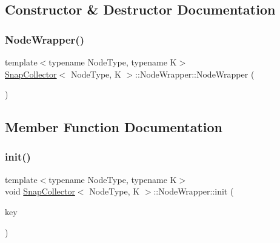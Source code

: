 \subsection{Constructor \& Destructor Documentation}
\mbox{\label{classSnapCollector_1_1NodeWrapper_a2c01b80b410f3d2d3ab88de500756085}} 
\subsubsection{\texorpdfstring{Node\+Wrapper()}{NodeWrapper()}}
{\footnotesize\ttfamily template$<$typename Node\+Type, typename K$>$ \\
\hyperlink{classSnapCollector}{Snap\+Collector}$<$ Node\+Type, K $>$\+::Node\+Wrapper\+::\+Node\+Wrapper (\begin{DoxyParamCaption}{ }\end{DoxyParamCaption})\hspace{0.3cm}{\ttfamily [inline]}}



\subsection{Member Function Documentation}
\mbox{\label{classSnapCollector_1_1NodeWrapper_a7b76d026e07104eac67de442c69935d4}} 
\subsubsection{\texorpdfstring{init()}{init()}\hspace{0.1cm}{\footnotesize\ttfamily [1/2]}}
{\footnotesize\ttfamily template$<$typename Node\+Type, typename K$>$ \\
void \hyperlink{classSnapCollector}{Snap\+Collector}$<$ Node\+Type, K $>$\+::Node\+Wrapper\+::init (\begin{DoxyParamCaption}\item[{K}]{key }\end{DoxyParamCaption})\hspace{0.3cm}{\ttfamily [inline]}}

